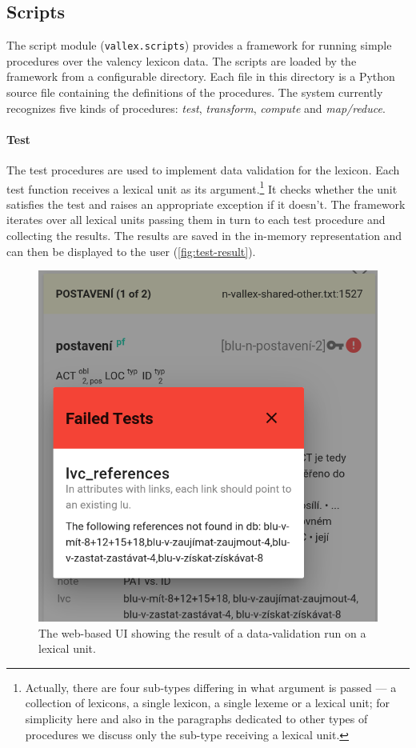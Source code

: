 \documentclass[10pt, a4paper]{article}
\newcommand{\py}[1]{{\tt #1}}
\begin{document}
\subsection{Scripts}
The script module (\py{vallex.scripts}) provides a framework for running simple procedures over the
valency lexicon data. The scripts are loaded by the framework from a configurable directory. Each
file in this directory is a Python source file containing the definitions of the procedures.
The system currently recognizes five kinds of procedures: \emph{test}, \emph{transform}, \emph{compute} and \emph{map/reduce}.

\paragraph{Test} The test procedures are used to implement data validation for the lexicon. Each test
function receives a lexical unit as its argument.\footnote{Actually, there are four sub-types differing in what
argument is passed --- a collection of lexicons, a single lexicon, a single lexeme or a lexical unit;
for simplicity here and also in the paragraphs dedicated to other types of procedures we discuss only the sub-type receiving a lexical unit.}
It checks whether the unit satisfies the test and raises an appropriate exception if it doesn't. The framework
iterates over all lexical units passing them in turn to each test procedure and collecting the results. The
results are saved in the in-memory representation and can then be displayed to the user (\autoref{fig:test-result}).
\begin{figure}
    \includegraphics[width=\hsize]{images/test-result.png}
    \caption{\label{fig:test-result}The web-based UI showing the result of a data-validation run on a lexical unit.}
\end{figure}
\end{document}
